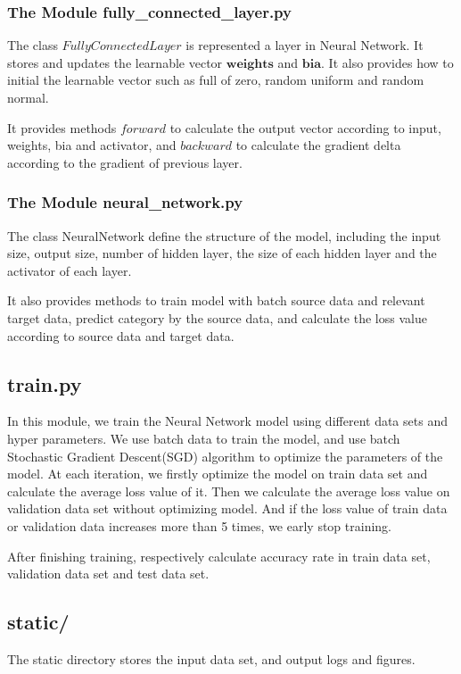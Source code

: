 \subsubsection{The Module fully\_connected\_layer.py}
The class \(FullyConnectedLayer\) is represented a layer in Neural Network. It stores and updates the learnable vector \(\boldsymbol{weights}\) and \(\boldsymbol{bia}\). It also provides how to initial the learnable vector such as full of zero, random uniform and random normal.

It provides methods \(forward\) to calculate the output vector according to input, weights, bia and activator, and \(backward\) to calculate the gradient delta according to the gradient of previous layer.
\subsubsection{The Module neural\_network.py}
The class NeuralNetwork define the structure of the model, including the input size, output size, number of hidden layer, the size of each hidden layer and the activator of each layer.

It also provides methods to train model with batch source data and relevant target data, predict category by the source data, and calculate the loss value according to source data and target data.

\subsection{train.py}
In this module, we train the Neural Network model using different data sets and hyper parameters. We use batch data to train the model, and use batch Stochastic Gradient Descent(SGD) algorithm to optimize the parameters of the  model. At each iteration, we firstly optimize the model on train data set and calculate the average loss value of it. Then we calculate the average loss value on validation data set without optimizing model. And if the loss value of train data or validation data increases more than 5 times, we early stop training.

After finishing training, respectively calculate accuracy rate in train data set, validation data set and test data set.

\subsection{static/}
The static directory stores the input data set, and output logs and figures.

